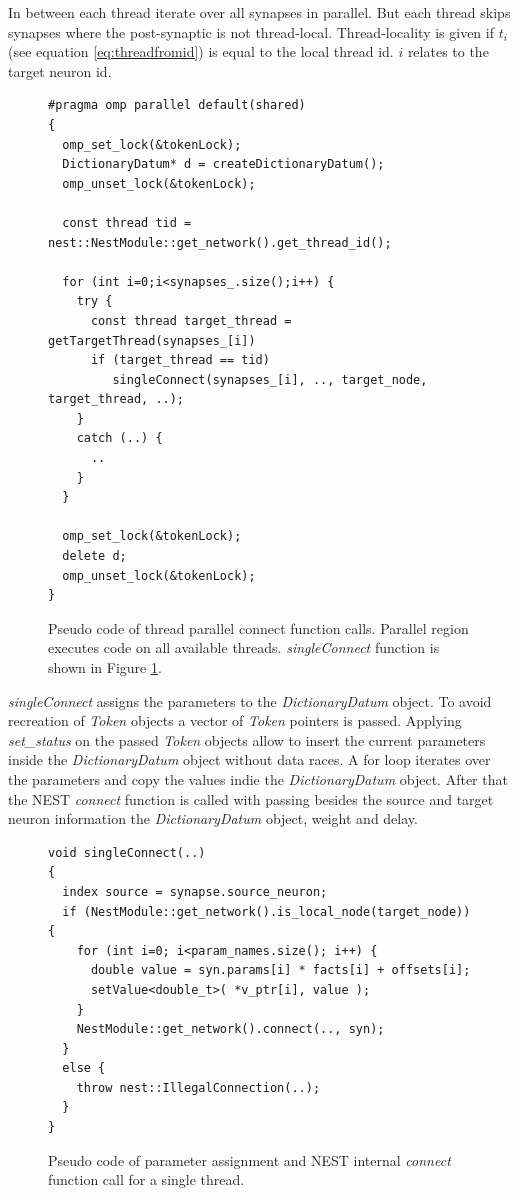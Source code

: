 In between each thread iterate over all synapses in parallel.
But each thread skips synapses where the post-synaptic is not thread-local.
Thread-locality is given if $t_i$ (see equation \ref{eq:threadfromid}) is equal to the local thread id.
$i$ relates to the target neuron id.
\begin{figure}[ht!]
\begin{lstlisting}[style=cppcode]
#pragma omp parallel default(shared)
{ 
  omp_set_lock(&tokenLock);
  DictionaryDatum* d = createDictionaryDatum();  
  omp_unset_lock(&tokenLock);

  const thread tid = nest::NestModule::get_network().get_thread_id();
      
  for (int i=0;i<synapses_.size();i++) {
    try {
      const thread target_thread = getTargetThread(synapses_[i])
      if (target_thread == tid)
	     singleConnect(synapses_[i], .., target_node, target_thread, ..);
    }
    catch (..) {
      ..
    }
  }
  
  omp_set_lock(&tokenLock);
  delete d;  
  omp_unset_lock(&tokenLock);
}
\end{lstlisting}
\caption{Pseudo code of thread parallel connect function calls.
Parallel region executes code on all available threads.
\emph{singleConnect} function is shown in Figure \ref{fig:singleConnect}.
}
\end{figure}
\emph{singleConnect} assigns the parameters to the \emph{DictionaryDatum} object.
To avoid recreation of \emph{Token} objects a vector of  \emph{Token} pointers is
passed. Applying \emph{set\_{}status} on the passed \emph{Token} objects allow to
insert the current parameters inside the \emph{DictionaryDatum} object without data races.
A for loop iterates over the parameters and copy the values indie the \emph{DictionaryDatum} object.
After that the NEST \emph{connect} function is called with passing besides the source and target
neuron information the \emph{DictionaryDatum} object, weight and delay.
\begin{figure}[ht!]
\begin{lstlisting}[style=cppcode]
void singleConnect(..)
{
  index source = synapse.source_neuron;
  if (NestModule::get_network().is_local_node(target_node)) { 
    for (int i=0; i<param_names.size(); i++) {
      double value = syn.params[i] * facts[i] + offsets[i];
      setValue<double_t>( *v_ptr[i], value );
    }
    NestModule::get_network().connect(.., syn);
  }
  else {
    throw nest::IllegalConnection(..);
  }
}
\end{lstlisting}
\caption{Pseudo code of parameter assignment and NEST internal \emph{connect} function call for a single thread.}
\label{fig:singleConnect}
\end{figure}

